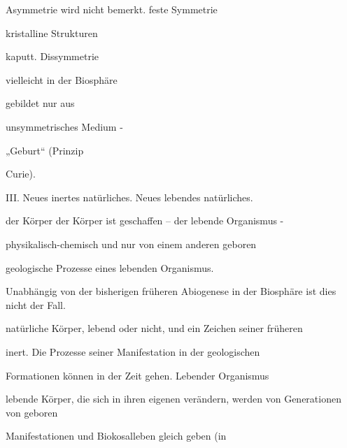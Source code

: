 \documentclass[11pt,a4paper]{book}
\begin{document}
Asymmetrie wird nicht bemerkt. feste Symmetrie



                                   kristalline Strukturen



                                   kaputt. Dissymmetrie



                                   vielleicht in der Biosphäre



                                   gebildet nur aus



                                   unsymmetrisches Medium -



                                   „Geburt“ (Prinzip



                                   Curie).



 



III. Neues inertes natürliches. Neues lebendes natürliches.



der Körper der Körper ist geschaffen -- der lebende Organismus -



physikalisch-chemisch und nur von einem anderen geboren



geologische Prozesse eines lebenden Organismus.



Unabhängig von der bisherigen früheren Abiogenese in der Biosphäre ist dies nicht der Fall.



natürliche Körper, lebend oder nicht, und ein Zeichen seiner früheren



inert. Die Prozesse seiner Manifestation in der geologischen



Formationen können in der Zeit gehen. Lebender Organismus



lebende Körper, die sich in ihren eigenen verändern, werden von Generationen von geboren



Manifestationen und Biokosalleben gleich geben (in
\end{document}
